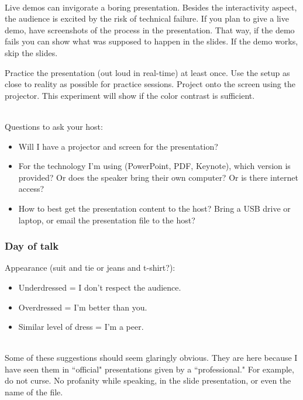 \ \\


Live demos can invigorate a boring presentation. Besides the interactivity aspect, the audience is excited by the risk of technical failure. 
If you plan to give a live demo, have screenshots of the process in the presentation. That way, if the demo fails you can show what was supposed to happen in the slides. If the demo works, skip the slides.


Practice the presentation (out loud in real-time) at least once.
Use the setup as close to reality as possible for practice sessions. Project onto the screen using the projector. This experiment will show if the color contrast is sufficient.

\ \\

Questions to ask your host:
\begin{itemize}
    \item Will I have a projector and screen for the presentation?
    \item For the technology I'm using (PowerPoint, PDF, Keynote), which version is provided? 
    Or does the speaker bring their own computer? 
    Or is there internet access?
    \item How to best get the presentation content to the host? Bring a USB drive or laptop, or email the presentation file to the host?
\end{itemize}


\subsubsection*{Day of talk}

Appearance (suit and tie or jeans and t-shirt?):
\begin{itemize}
    \item Underdressed = I don't respect the audience.
    \item Overdressed = I'm better than you.
    \item Similar level of dress = I'm a peer.
\end{itemize}

\ \\

Some of these suggestions should seem glaringly obvious. They are here because I have seen them in ``official" presentations given by a ``professional." For example, do not curse. No profanity while speaking, in the slide presentation, or even the name of the file.


